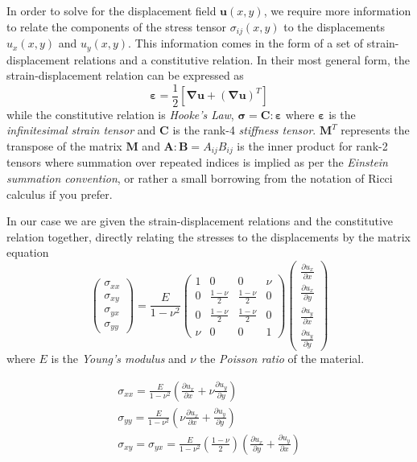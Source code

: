 \documentclass[11pt]{article}
\newcommand\p[2]{\frac{\partial #1}{\partial #2}}
\begin{document}
In order to solve for the displacement field $\bm{u}(x,y)$, we require more information to relate the components of the stress tensor $\sigma_{ij}(x,y)$ to the displacements $u_x(x,y)$ and $u_y(x,y)$. This information comes in the form of a set of strain-displacement relations and a constitutive relation. In their most general form, the strain-displacement relation can be expressed as
\begin{equation*}
  \bm{\varepsilon} =\frac{1}{2} \left[ \bm{\nabla u} + (\bm{\nabla u})^T \right]
\end{equation*}
while the constitutive relation is \emph{Hooke's Law}, $\bm{\sigma} = \bm{C : \varepsilon}$ where $\bm{\varepsilon}$ is the \emph{infinitesimal strain tensor} and $\bm{C}$ is the rank-4 \emph{stiffness tensor}. $\bm{M}^T$ represents the transpose of the matrix $\bm{M}$ and $\bm{A:B} = A_{ij}B_{ij}$ is the inner product for rank-2 tensors where summation over repeated indices is implied as per the \emph{Einstein summation convention}, or rather a small borrowing from the notation of Ricci calculus if you prefer.

In our case we are given the strain-displacement relations and the constitutive relation together, directly relating the stresses to the displacements by the matrix equation
\begin{equation}
\begin{pmatrix}
  \sigma_{xx} \\
  \sigma_{xy} \\
  \sigma_{yx} \\
  \sigma_{yy}
\end{pmatrix}
=
\frac{E}{1-\nu^2}
\begin{pmatrix}
  1 & 0 & 0 & \nu \\
  0 & \frac{1-\nu}{2} & \frac{1-\nu}{2} & 0 \\
  0 & \frac{1-\nu}{2} & \frac{1-\nu}{2} & 0 \\
  \nu & 0 & 0 & 1
\end{pmatrix}
\begin{pmatrix}
\p{u_x}{x} \\
\p{u_x}{y} \\
\p{u_y}{x} \\
\p{u_y}{y}
\end{pmatrix}
\end{equation}
where $E$ is the \emph{Young's modulus} and $\nu$ the \emph{Poisson ratio} of the material.

\begin{gather}
  \sigma_{xx} = \frac{E}{1-\nu^2} \left( \p{u_x}{x} + \nu\p{u_y}{y} \right) \nonumber \\
  \sigma_{yy} = \frac{E}{1-\nu^2} \left( \nu\p{u_x}{x} + \p{u_y}{y} \right) \\
  \sigma_{xy} = \sigma_{yx} = \frac{E}{1-\nu^2} \left( \frac{1-\nu}{2} \right) \left(\p{u_x}{y} + \p{u_y}{x} \right) \nonumber
\end{gather}
\end{document}
